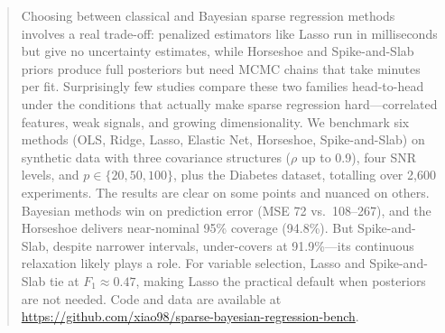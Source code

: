 \begin{abstract}
Choosing between classical and Bayesian sparse regression methods involves a real trade-off: penalized estimators like Lasso run in milliseconds but give no uncertainty estimates, while Horseshoe and Spike-and-Slab priors produce full posteriors but need MCMC chains that take minutes per fit.
Surprisingly few studies compare these two families head-to-head under the conditions that actually make sparse regression hard---correlated features, weak signals, and growing dimensionality.
We benchmark six methods (OLS, Ridge, Lasso, Elastic Net, Horseshoe, Spike-and-Slab) on synthetic data with three covariance structures ($\rho$ up to 0.9), four SNR levels, and $p \in \{20, 50, 100\}$, plus the Diabetes dataset, totalling over 2{,}600 experiments.
The results are clear on some points and nuanced on others.
Bayesian methods win on prediction error (MSE 72 vs.\ 108--267), and the Horseshoe delivers near-nominal 95\% coverage (94.8\%).
But Spike-and-Slab, despite narrower intervals, under-covers at 91.9\%---its continuous relaxation likely plays a role.
For variable selection, Lasso and Spike-and-Slab tie at $F_1 \approx 0.47$, making Lasso the practical default when posteriors are not needed.
Code and data are available at \url{https://github.com/xiao98/sparse-bayesian-regression-bench}.
\end{abstract}
